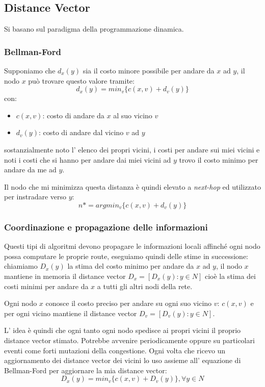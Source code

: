 \subsection{Distance Vector}
Si basano sul paradigma della programmazione dinamica.

\subsubsection{Bellman-Ford}
Supponiamo che $d_x(y)$ sia il costo minore possibile per andare da $x$ ad $y$, il nodo $x$ può trovare questo valore tramite:
$$ d_x(y) = min_v\{c(x,v) + d_v(y)\} $$
con:
\begin{itemize}
    \item $c(x,v)$: costo di andare da $x$ al suo vicino $v$
    \item $d_v(y)$: costo di andare dal vicino $v$ ad $y$
\end{itemize}
sostanzialmente noto l' elenco dei propri vicini, i costi per andare sui miei vicini e noti i costi che si hanno per andare dai miei vicini ad $y$ trovo il costo minimo per andare da me ad $y$.

Il nodo che mi minimizza questa distanza è quindi elevato a \emph{next-hop} ed utilizzato per instradare verso $y$:
$$ n* = arg min_v\{c(x,v) + d_v(y)\}$$

\subsubsection{Coordinazione e propagazione delle informazioni}
Questi tipi di algoritmi devono propagare le informazioni locali affinché ogni nodo possa computare le proprie route, eseguiamo quindi delle stime in successione:
chiamiamo $D_x(y)$ la stima del costo minimo per andare da $x$ ad $y$, il nodo $x$ mantiene in memoria il distance vector $D_x = [D_x(y):y \in N]$ cioè la stima dei costi minimi per andare da $x$ a tutti gli altri nodi della rete.

Ogni nodo $x$ conosce il costo preciso per andare su ogni suo vicino $v$: $c(x,v)$ e per ogni vicino mantiene il distance vector $D_v = [D_v(y): y \in N]$.

L' idea è quindi che ogni tanto ogni nodo spedisce ai propri vicini il proprio distance vector stimato.
Potrebbe avvenire periodicamente oppure su particolari eventi come forti mutazioni della congestione.
Ogni volta che ricevo un aggiornamento dei distance vector dei vicini lo uso assieme all' equazione di Bellman-Ford per aggiornare la mia distance vector:
$$ D_x(y) = min_v\{c(x,v) + D_v(y)\}, \forall y \in N $$

